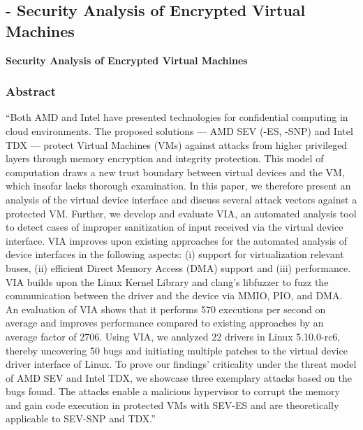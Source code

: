 
\subsection{\cite{hetzelt_security_2017} - Security Analysis of Encrypted Virtual Machines}

\textbf{Security Analysis of Encrypted Virtual Machines }

\subsubsection*{Abstract \cite{hetzelt_security_2017}}
“Both AMD and Intel have presented technologies 
for confidential computing in cloud environments. 
The proposed solutions — AMD SEV (-ES, -SNP) and Intel TDX — protect Virtual Machines (VMs) against attacks from higher privileged layers through memory encryption and integrity protection. 
This model of computation draws a new trust boundary between virtual devices and the VM, which insofar lacks thorough examination. 
In this paper, we therefore present an analysis of the virtual device interface and discuss several attack vectors against a protected VM. 
Further, we develop and evaluate VIA, an automated analysis tool to detect cases of improper sanitization of input received via the virtual device interface. 
VIA improves upon existing approaches for the automated analysis of device interfaces in the following aspects: 
(i) support for virtualization relevant buses, 
(ii) efficient Direct Memory Access (DMA) support and 
(iii) performance. 
VIA builds upon the Linux Kernel Library and clang’s libfuzzer to fuzz 
the communication between the driver and the device via MMIO, PIO, and DMA. 
An evaluation of VIA shows that it performs 570 executions per second on average 
and improves performance compared to existing approaches by an average factor of 2706.
 Using VIA, we analyzed 22 drivers in Linux 5.10.0-rc6, 
 thereby uncovering 50 bugs and initiating multiple patches to the virtual device driver interface of Linux. 
 To prove our findings’ criticality under the threat model of AMD SEV and Intel TDX, we showcase three exemplary attacks based on the bugs found. 
 The attacks enable a malicious hypervisor to corrupt the memory and gain code execution in protected VMs with SEV-ES and are theoretically applicable to SEV-SNP and TDX.”

